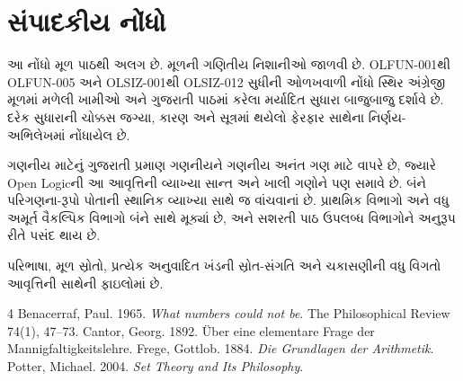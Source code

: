 \section*{સંપાદકીય નોંધો}
આ નોંધો મૂળ પાઠથી અલગ છે. મૂળની ગણિતીય નિશાનીઓ જાળવી છે.
OLFUN-001થી OLFUN-005 અને OLSIZ-001થી OLSIZ-012 સુધીની ઓળખવાળી
નોંધો સ્થિર અંગ્રેજી મૂળમાં મળેલી ખામીઓ અને ગુજરાતી પાઠમાં કરેલા
મર્યાદિત સુધારા બાજુબાજુ દર્શાવે છે. દરેક સુધારાની ચોક્કસ જગ્યા,
કારણ અને સૂત્રમાં થયેલો ફેરફાર સાથેના નિર્ણય-અભિલેખમાં નોંધાયેલ છે.

ગણનીય માટેનું ગુજરાતી પ્રમાણ ગણનીયને ગણનીય અનંત ગણ માટે વાપરે છે,
જ્યારે Open Logicની આ આવૃત્તિની વ્યાખ્યા સાન્ત અને ખાલી ગણોને પણ
સમાવે છે. બંને પરિગણના-રૂપો પોતાની સ્થાનિક વ્યાખ્યા સાથે જ વાંચવાનાં છે.
પ્રાથમિક વિભાગો અને વધુ અમૂર્ત વૈકલ્પિક વિભાગો બંને સાથે મૂક્યાં છે,
અને સશરતી પાઠ ઉપલબ્ધ વિભાગોને અનુરૂપ રીતે પસંદ થાય છે.

પરિભાષા, મૂળ સ્રોતો, પ્રત્યેક અનુવાદિત ખંડની સ્રોત-સંગતિ અને
ચકાસણીની વધુ વિગતો આવૃત્તિની સાથેની ફાઇલોમાં છે.
\begin{thebibliography}{4}
Benacerraf, Paul. 1965. \emph{What numbers could not be}.
The Philosophical Review 74(1), 47--73.
Cantor, Georg. 1892. Über eine elementare Frage der Mannigfaltigkeitslehre.
Frege, Gottlob. 1884. \emph{Die Grundlagen der Arithmetik}.
Potter, Michael. 2004. \emph{Set Theory and Its Philosophy}.
\end{thebibliography}

